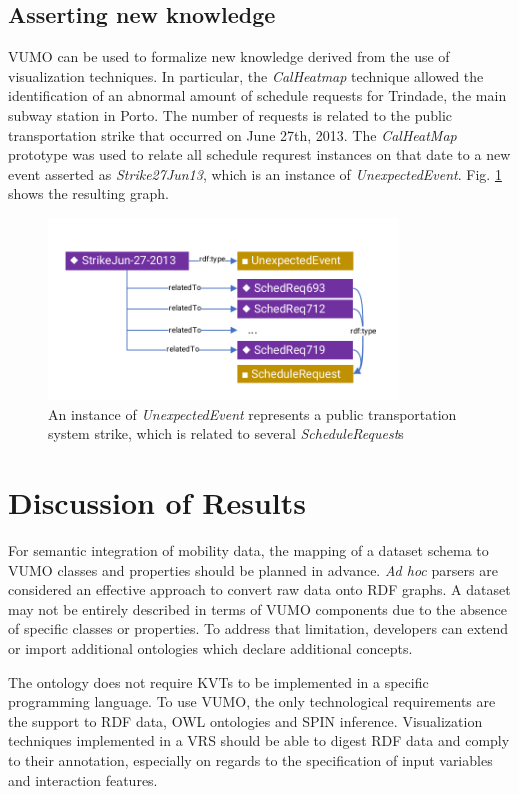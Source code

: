 \documentclass[]{interact}
\theoremstyle{plain}%
\theoremstyle{definition}
\theoremstyle{remark}
\theoremstyle{definition}
\begin{document}
\subsection{Asserting new knowledge}

VUMO can be used to formalize new knowledge derived from the use of visualization techniques. In particular, the \textit{CalHeatmap} technique allowed the identification of an abnormal amount of schedule requests for Trindade, the main subway station in Porto. The number of requests is related to the public transportation strike that occurred on June 27th, 2013. The \textit{CalHeatMap} prototype was used to relate all schedule requrest instances on that date to a new event asserted as \textit{Strike27Jun13}, which is an instance of \textit{UnexpectedEvent}. Fig. \ref{fig:strike} shows the resulting graph.

\begin{figure}[!t]
\centering
\includegraphics[width=9.3cm]{images/strike2.pdf}
\caption{An instance of \textit{UnexpectedEvent} represents a public transportation system strike, which is related to several \textit{ScheduleRequest}s}
\label{fig:strike}
\end{figure}


\section{Discussion of Results}
\label{sec:discussion}

For semantic integration of mobility data, the mapping of a dataset schema to VUMO classes and properties should be planned in advance. \textit{Ad hoc} parsers are considered an effective approach to convert raw data onto RDF graphs. A dataset may not be entirely described in terms of VUMO components due to the absence of specific classes or properties. To address that limitation, developers can extend or import additional ontologies which declare additional concepts.

The ontology does not require KVTs to be implemented in a specific programming language. To use VUMO, the only technological requirements are the support to RDF data, OWL ontologies and SPIN inference. Visualization techniques implemented in a VRS should be able to digest RDF data and comply to their annotation, especially on regards to the specification of input variables and interaction features.
\end{document}
